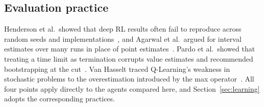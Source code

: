 \subsection{Evaluation practice}
Henderson et al.\ showed that deep RL results often fail to reproduce across random seeds and implementations~\cite{henderson2018}, and Agarwal et al.\ argued for interval estimates over many runs in place of point estimates~\cite{agarwal2021}. Pardo et al.\ showed that treating a time limit as termination corrupts value estimates and recommended bootstrapping at the cut~\cite{pardo2018}. Van Hasselt traced Q-Learning's weakness in stochastic problems to the overestimation introduced by the max operator~\cite{vanhasselt2010}. All four points apply directly to the agents compared here, and Section~\ref{sec:learning} adopts the corresponding practices.
